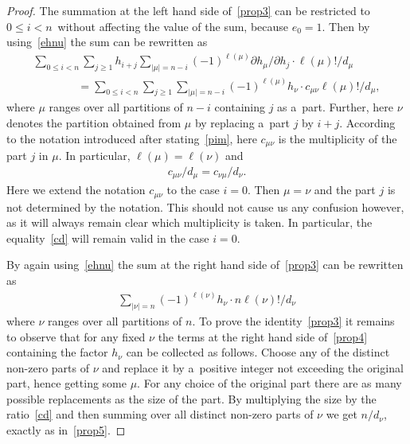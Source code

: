 \documentclass[11pt]{article}
\numberwithin{equation}{section}
\renewcommand\ge{\geqslant}
\renewcommand\le{\leqslant}
\begin{document}
\begin{proof}
The summation at the left hand side of~\eqref{prop3} can be restricted to $0\le i<n$~without af\/fecting
the value of the sum, because $e_0=1$.
Then by using~\eqref{ehnu} the sum can be rewritten as
\begin{gather}
\sum_{0\le i<n}\sum_{j\ge1}h_{i+j}\sum_{|\mu|=n-i}(-1)^{\ell(\mu)}
\partial h_\mu/\partial h_j\cdot\ell(\mu)
!/d_\mu
\nonumber
\\
\qquad\qquad
=\sum_{0\le i<n}\sum_{j\ge1}\sum_{|\mu|=n-i}(-1)^{\ell(\mu)}h_\nu\cdot c_{\mu\nu}\ell(\mu)!/d_\mu,
\label{prop4}
\end{gather}
where $\mu$ ranges over all partitions of $n-i$ containing $j$ as a~part.
Further, here $\nu$ denotes the partition obtained from $\mu$ by replacing a~part $j$ by $i+j$.
According to the notation introduced after stating~\eqref{pim}, here $c_{\mu\nu}$ is the
multiplicity of the part $j$ in $\mu$.
In particular, $\ell(\mu)=\ell(\nu)$ and
\begin{gather}
\label{cd}
c_{\mu\nu}/d_\mu=c_{\nu\mu}
/d_\nu.
\end{gather}
Here  we extend the notation $c_{\mu\nu}$ to the case $i=0$.
Then $\mu=\nu$ and the part $j$ is not determined by the notation.
This should not cause us any confusion however, as it will always remain clear which multiplicity is taken.
In particular, the equality~\eqref{cd} will remain valid in the case $i=0$.

By again using~\eqref{ehnu} the sum at the right hand side of~\eqref{prop3} can be rewritten as
\begin{gather}
\label{prop5}
\sum_{|\nu|=n}(-1)^{\ell(\nu)}h_\nu\cdot n\ell(\nu)!/d_\nu
\end{gather}
where  $\nu$ ranges over all partitions of $n$.
To prove the identity~\eqref{prop3} it remains to observe that for any f\/ixed $\nu$ the terms at the right
hand side of~\eqref{prop4} containing the factor $h_\nu$ can be collected as follows.
Choose any of the distinct non-zero parts of $\nu$ and replace it by a~positive integer not exceeding the
original part, hence getting some $\mu$.
For any choice of the original part there are as many possible replacements as the size of the part.
By multiplying the size by the ratio~\eqref{cd} and then summing over all distinct non-zero parts of $\nu$
we get $n/d_\nu$, exactly as in~\eqref{prop5}.
\end{proof}
\end{document}
